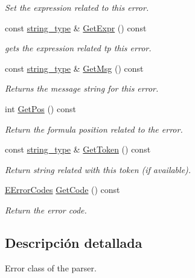 \begin{DoxyCompactItemize}
\begin{DoxyCompactList}\small\item\em Set the expression related to this error. \end{DoxyCompactList}\item 
const \hyperlink{namespacemu_ae9f8b44d9a97dd397180891e8390c3e9}{string\+\_\+type} \& \hyperlink{classmu_1_1_parser_error_a845ae0a3276f1f0326c6b9f4d946bcbf}{Get\+Expr} () const 
\begin{DoxyCompactList}\small\item\em gets the expression related tp this error. \end{DoxyCompactList}\item 
const \hyperlink{namespacemu_ae9f8b44d9a97dd397180891e8390c3e9}{string\+\_\+type} \& \hyperlink{classmu_1_1_parser_error_af03a4eb049e106be1dbc957ab4c90ee8}{Get\+Msg} () const 
\begin{DoxyCompactList}\small\item\em Returns the message string for this error. \end{DoxyCompactList}\item 
int \hyperlink{classmu_1_1_parser_error_a377d53b65214c5d9f7a1789cbf05512b}{Get\+Pos} () const 
\begin{DoxyCompactList}\small\item\em Return the formula position related to the error. \end{DoxyCompactList}\item 
const \hyperlink{namespacemu_ae9f8b44d9a97dd397180891e8390c3e9}{string\+\_\+type} \& \hyperlink{classmu_1_1_parser_error_a3ddb4de710a8b0485e1b4060ccc7f08f}{Get\+Token} () const 
\begin{DoxyCompactList}\small\item\em Return string related with this token (if available). \end{DoxyCompactList}\item 
\hyperlink{namespacemu_acf304a3ef5c4625d0eac5953aa1b688a}{E\+Error\+Codes} \hyperlink{classmu_1_1_parser_error_aad82b1aeb00b5e64a56956490febd2ec}{Get\+Code} () const 
\begin{DoxyCompactList}\small\item\em Return the error code. \end{DoxyCompactList}\end{DoxyCompactItemize}


\subsection{Descripción detallada}
Error class of the parser. 

